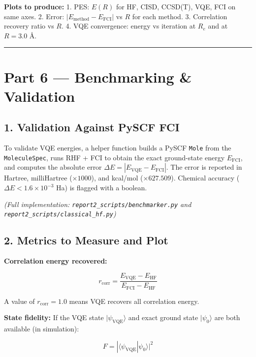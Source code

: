 \documentclass[
  11pt,
]{report}
\begin{document}
\textbf{Plots to produce:} 1. PES: \(E(R)\) for HF, CISD, CCSD(T), VQE,
FCI on same axes. 2. Error: \(|E_{\text{method}} - E_{\text{FCI}}|\) vs
\(R\) for each method. 3. Correlation recovery ratio vs \(R\). 4. VQE
convergence: energy vs iteration at \(R_e\) and at \(R = 3.0\) Å.

\begin{center}\rule{0.5\linewidth}{0.5pt}\end{center}

\section{Part 6 --- Benchmarking \&
Validation}\label{part-6-benchmarking-validation}

\subsection{1. Validation Against PySCF
FCI}\label{validation-against-pyscf-fci}

To validate VQE energies, a helper function builds a PySCF \texttt{Mole}
from the \texttt{MoleculeSpec}, runs RHF + FCI to obtain the exact
ground-state energy \(E_{\text{FCI}}\), and computes the absolute error
\(\Delta E = |E_{\text{VQE}} - E_{\text{FCI}}|\). The error is reported
in Hartree, milliHartree (\(\times 1000\)), and kcal/mol
(\(\times 627.509\)). Chemical accuracy
(\(\Delta E < 1.6 \times 10^{-3}\) Ha) is flagged with a boolean.

\emph{(Full implementation: \texttt{report2\_scripts/benchmarker.py} and
\texttt{report2\_scripts/classical\_hf.py})}

\subsection{2. Metrics to Measure and
Plot}\label{metrics-to-measure-and-plot}

\textbf{Correlation energy recovered:}

\[r_{\text{corr}} = \frac{E_{\text{VQE}} - E_{\text{HF}}}{E_{\text{FCI}} - E_{\text{HF}}}\]

A value of \(r_{\text{corr}} = 1.0\) means VQE recovers all correlation
energy.

\textbf{State fidelity:} If the VQE state \(|\psi_{\text{VQE}}\rangle\)
and exact ground state \(|\psi_0\rangle\) are both available (in
simulation):

\[F = |\langle\psi_{\text{VQE}}|\psi_0\rangle|^2\]
\end{document}
